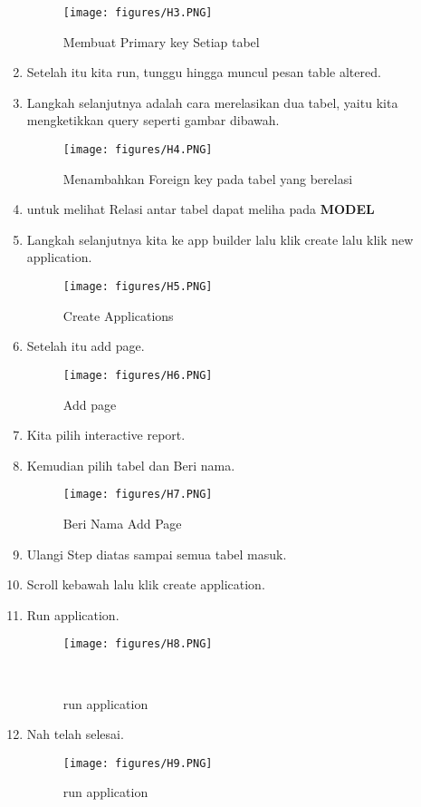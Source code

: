 \begin{enumerate}
\begin{figure}[!htbp]
\centering
\texttt{[image: figures/H3.PNG]}
\caption{Membuat Primary key Setiap tabel}
\label{penanda}
\end{figure}
\item Setelah itu kita run, tunggu hingga muncul pesan table altered.
\item Langkah selanjutnya adalah cara merelasikan dua tabel, yaitu kita mengketikkan query seperti gambar dibawah.
\begin{figure}[!htbp]
\centering
\texttt{[image: figures/H4.PNG]}
\caption{Menambahkan Foreign key pada tabel yang berelasi}
\label{penanda}
\end{figure}
\item untuk melihat Relasi antar tabel dapat meliha pada \textbf{MODEL}
\item Langkah selanjutnya kita ke app builder lalu klik create lalu klik new application.
\begin{figure}[!htbp]
\centering
\texttt{[image: figures/H5.PNG]}
\caption{Create Applications}
\label{penanda}
\end{figure}
\item  Setelah itu add page.
\begin{figure}[!htbp]
\centering
\texttt{[image: figures/H6.PNG]}
\caption{Add page}
\label{penanda}
\end{figure}
\item Kita pilih interactive report.
\item Kemudian pilih tabel dan Beri nama.
\begin{figure}[!htbp]
\centering
\texttt{[image: figures/H7.PNG]}
\caption{Beri Nama Add Page}
\label{penanda}
\end{figure}
\item Ulangi Step diatas sampai semua tabel masuk.
\item  Scroll kebawah lalu klik create application.
\item Run application.
\begin{figure}[!htbp]
\centering
\texttt{[image: figures/H8.PNG]}
\caption{run application}\\
\label{penanda}
\end{figure}
\item Nah telah selesai.
\begin{figure}[!htbp]
\centering
\texttt{[image: figures/H9.PNG]}
\caption{run application}
\label{penanda}
\end{figure}
\end{enumerate}

